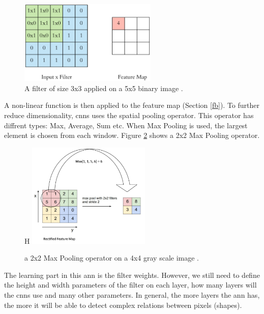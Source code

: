 \documentclass[runningheads]{llncs}
\begin{document}
\begin{figure}[H]
    \label{fm}
    \centering
    \includegraphics[height=4cm]{filter}
    \caption{A filter of size 3x3 applied on a 5x5 binary image \cite{appf}.}
\end{figure}


A non-linear function is then applied to the feature map (Section \ref{fb}).
To further reduce dimensionality, \gls{cnns} uses the spatial pooling operator.
This operator has diffrent types: Max, Average, Sum etc. 
When Max Pooling is used, the largest element is chosen from each window.
Figure \ref{mp} shows a 2x2 Max Pooling operator.


\begin{figure}{H}
    \label{mp}
    \centering
    \includegraphics[height=5cm]{max_pool}
    \caption{a 2x2 Max Pooling operator on a 4x4 gray scale image \cite{maxpool}.}
\end{figure}

The learning part in this \gls{ann} is the filter weights. However, we 
still need to define the height and width parameters of the filter on each layer, how
many layers will the \gls{cnns} use and many other parameters. In general, 
the more layers the \gls{ann} has, the more it will be able to detect complex 
relations between pixels (shapes).
\end{document}
